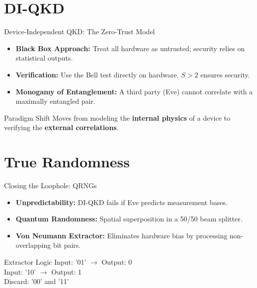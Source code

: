 \documentclass[aspectratio=169]{beamer}
\begin{document}
\section{DI-QKD}
\begin{frame}{Device-Independent QKD: The Zero-Trust Model}
    \begin{itemize}
        \item \textbf{Black Box Approach:} Treat all hardware as untrusted; security relies on statistical outputs.
        \item \textbf{Verification:} Use the Bell test directly on hardware. $S > 2$ ensures security.
        \item \textbf{Monogamy of Entanglement:} A third party (Eve) cannot correlate with a maximally entangled pair.
    \end{itemize}
    \begin{block}{Paradigm Shift}
        Moves from modeling the \textbf{internal physics} of a device to verifying the \textbf{external correlations}.
    \end{block}
\end{frame}

\section{True Randomness}
\begin{frame}{Closing the Loophole: QRNGs}
    \begin{itemize}
        \item \textbf{Unpredictability:} DI-QKD fails if Eve predicts measurement bases.
        \item \textbf{Quantum Randomness:} Spatial superposition in a 50/50 beam splitter.
        \item \textbf{Von Neumann Extractor:} Eliminates hardware bias by processing non-overlapping bit pairs.
    \end{itemize}
    \begin{exampleblock}{Extractor Logic}
        Input: '01' $\rightarrow$ Output: 0 \\
        Input: '10' $\rightarrow$ Output: 1 \\
        Discard: '00' and '11'
    \end{exampleblock}
\end{frame}
\end{document}
